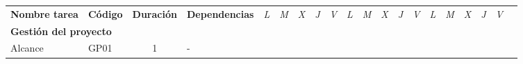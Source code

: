 \begin{longtable}[c]{llclllllllllllllllll}
        \multicolumn{1}{|c|}{\multirow{-2}{*}{\cellcolor[HTML]{FFFFFF}\textbf{Nombre tarea}}} & \multicolumn{1}{c|}{\multirow{-2}{*}{\cellcolor[HTML]{FFFFFF}\textbf{Código}}} & \multicolumn{1}{c|}{\multirow{-2}{*}{\cellcolor[HTML]{FFFFFF}\textbf{Duración}}} & \multicolumn{1}{c|}{\multirow{-2}{*}{\cellcolor[HTML]{FFFFFF}\textbf{Dependencias}}} & \multicolumn{1}{l|}{\textit{L}} & \multicolumn{1}{l|}{\textit{M}} & \multicolumn{1}{l|}{\textit{X}} & \multicolumn{1}{l|}{\textit{J}} & \multicolumn{1}{l|}{\textit{V}} & \multicolumn{1}{l|}{\textit{L}} & \multicolumn{1}{l|}{\textit{M}} & \multicolumn{1}{l|}{\textit{X}} & \multicolumn{1}{l|}{\textit{J}} & \multicolumn{1}{l|}{\textit{V}} & \multicolumn{1}{l|}{\textit{L}} & \multicolumn{1}{l|}{\textit{M}} & \multicolumn{1}{l|}{\textit{X}} & \multicolumn{1}{l|}{\textit{J}} & \multicolumn{1}{l|}{\textit{V}}               &  \\ \cline{1-19}
        \multicolumn{4}{|l|}{\textbf{Gestión del proyecto}}                                                                                                                                                                                                                                                                                              & \multicolumn{15}{l|}{}                                                                                                                                                                                                                                                                                                                                                                                                                                                                                                                    &  \\ \cline{1-19}
        \multicolumn{1}{|l|}{Alcance}                                                         & \multicolumn{1}{l|}{GP01}                                                      & \multicolumn{1}{c|}{1}                                                           & \multicolumn{1}{l|}{-}                                                               & \cellcolor[HTML]{C6E0B4}        & \cellcolor[HTML]{C6E0B4}        & \cellcolor[HTML]{C6E0B4}        & \cellcolor[HTML]{C6E0B4}        & \cellcolor[HTML]{C6E0B4}        &                                 &                                 &                                 &                                 &                                 &                                 &                                 &                                 &                                 & \multicolumn{1}{l|}{}                         &  \\ \cline{1-4}

\end{longtable}

